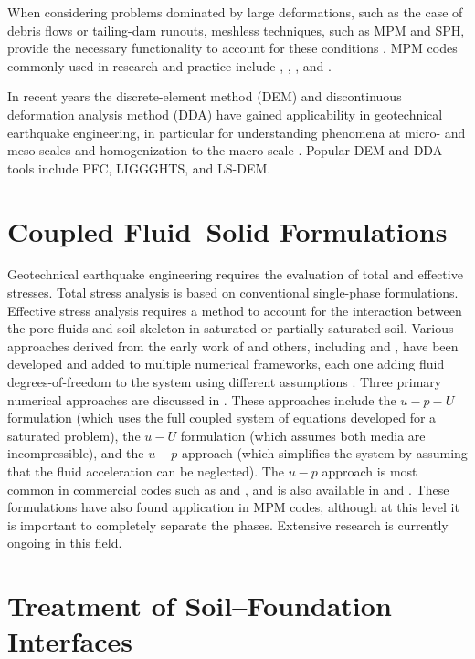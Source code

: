 When considering problems dominated by large deformations, such as the case of debris flows or tailing-dam runouts, meshless techniques, such as MPM and SPH, provide the necessary functionality to account for these conditions \citep{Mast15}. MPM codes commonly used in research and practice include , , , and .

In recent years the discrete-element method (DEM) and discontinuous deformation analysis method (DDA) have gained applicability in geotechnical earthquake engineering, in particular for understanding phenomena at micro- and meso-scales and homogenization to the macro-scale \citep{kawamoto2018}. Popular DEM and DDA tools include PFC, LIGGGHTS, and LS-DEM.   

\section{Coupled Fluid--Solid Formulations}
\label{sec:resp_geotech_2}

Geotechnical earthquake engineering requires the evaluation of total and effective stresses. Total stress analysis is based on conventional single-phase formulations. Effective stress analysis requires a method to account for the interaction between the pore fluids and soil skeleton in saturated or partially saturated soil. Various approaches derived from the early work of \citet{Biot41, Biot56, Biot62} and others, including \citet{Borja06} and \citet{Ehlers02}, have been developed and added to multiple numerical frameworks, each one adding fluid degrees-of-freedom to the system using different assumptions \citep{Arduino01}. Three primary numerical approaches are discussed in \citet{Zienk84}. These approaches include the $u-p-U$ formulation (which uses the full coupled system of equations developed for a saturated problem), the $u-U$ formulation (which assumes both media are incompressible), and the $u-p$ approach (which simplifies the system by assuming that the fluid acceleration can be neglected). The $u-p$ approach is most common in commercial codes such as  and , and is also available in  and . These formulations have also found application in MPM codes, although at this level it is important to completely separate the phases. Extensive research is currently ongoing in this field. 

\section{Treatment of Soil--Foundation Interfaces}
\label{sec:resp_geotech_3}

